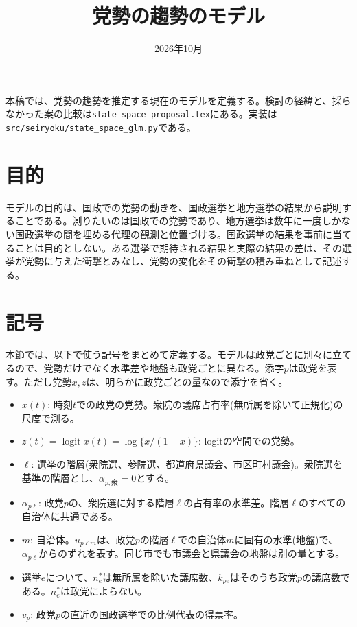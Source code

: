 \documentclass[a4paper,11pt]{ltjsarticle}
\title{党勢の趨勢のモデル}
\author{}
\date{2026年10月}
\begin{document}
\maketitle

本稿では、党勢の趨勢を推定する現在のモデルを定義する。検討の経緯と、採らなかった案の比較は\texttt{state\_space\_proposal.tex}にある。実装は\texttt{src/seiryoku/state\_space\_glm.py}である。

\section{目的}

モデルの目的は、国政での党勢の動きを、国政選挙と地方選挙の結果から説明することである。測りたいのは国政での党勢であり、地方選挙は数年に一度しかない国政選挙の間を埋める代理の観測と位置づける。国政選挙の結果を事前に当てることは目的としない。ある選挙で期待される結果と実際の結果の差は、その選挙が党勢に与えた衝撃とみなし、党勢の変化をその衝撃の積み重ねとして記述する。

\section{記号}

本節では、以下で使う記号をまとめて定義する。モデルは政党ごとに別々に立てるので、党勢だけでなく水準差や地盤も政党ごとに異なる。添字$p$は政党を表す。ただし党勢$x,z$は、明らかに政党ごとの量なので添字を省く。

\begin{itemize}
  \item $x(t)$: 時刻$t$での政党の党勢。衆院の議席占有率(無所属を除いて正規化)の尺度で測る。
  \item $z(t)=\operatorname{logit}x(t)=\log\{x/(1-x)\}$: logitの空間での党勢。
  \item $\ell$: 選挙の階層(衆院選、参院選、都道府県議会、市区町村議会)。衆院選を基準の階層とし、$\alpha_{p,\text{衆}}=0$とする。
  \item $\alpha_{p\ell}$: 政党$p$の、衆院選に対する階層$\ell$の占有率の水準差。階層$\ell$のすべての自治体に共通である。
  \item $m$: 自治体。$u_{p\ell m}$は、政党$p$の階層$\ell$での自治体$m$に固有の水準(地盤)で、$\alpha_{p\ell}$からのずれを表す。同じ市でも市議会と県議会の地盤は別の量とする。
  \item 選挙$e$について、$n^\ast_e$は無所属を除いた議席数、$k_{pe}$はそのうち政党$p$の議席数である。$n^\ast_e$は政党によらない。
  \item $v_p$: 政党$p$の直近の国政選挙での比例代表の得票率。
\end{itemize}
\end{document}
